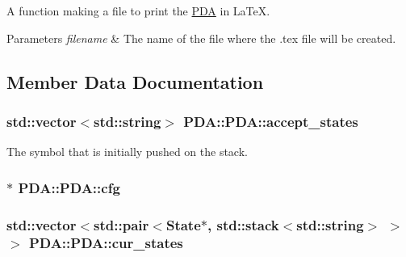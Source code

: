 \-A function making a file to print the \hyperlink{classPDA_1_1PDA}{\-P\-D\-A} in \-La\-Te\-X. 


\begin{DoxyParams}{\-Parameters}
{\em filename} & \-The name of the file where the .tex file will be created. \\
\hline
\end{DoxyParams}


\subsection{\-Member \-Data \-Documentation}
\hypertarget{classPDA_1_1PDA_a7c6d15bda561a77936c986290af7bf66}{
\subsubsection[{accept\-\_\-states}]{\setlength{\rightskip}{0pt plus 5cm}std\-::vector$<$std\-::string$>$ {\bf \-P\-D\-A\-::\-P\-D\-A\-::accept\-\_\-states}}}\label{d1/dc5/classPDA_1_1PDA_a7c6d15bda561a77936c986290af7bf66}


\-The symbol that is initially pushed on the stack. 

\hypertarget{classPDA_1_1PDA_aef026ff20ec36b368db8cf05dc7d6ef7}{
\subsubsection[{cfg}]{$\ast$ {\bf \-P\-D\-A\-::\-P\-D\-A\-::cfg}}}\label{d1/dc5/classPDA_1_1PDA_aef026ff20ec36b368db8cf05dc7d6ef7}
\hypertarget{classPDA_1_1PDA_a71d7a97ddb658ed2c07e30001ff6ba1b}{
\subsubsection[{cur\-\_\-states}]{\setlength{\rightskip}{0pt plus 5cm}std\-::vector$<$std\-::pair$<${\bf \-State}$\ast$, std\-::stack$<$std\-::string$>$ $>$ $>$ {\bf \-P\-D\-A\-::\-P\-D\-A\-::cur\-\_\-states}}}\label{d1/dc5/classPDA_1_1PDA_a71d7a97ddb658ed2c07e30001ff6ba1b}


